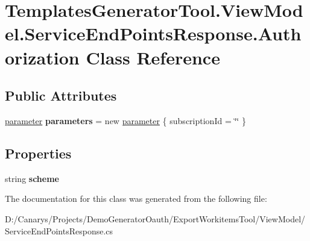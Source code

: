 \hypertarget{class_templates_generator_tool_1_1_view_model_1_1_service_end_points_response_1_1_authorization}{}\section{Templates\+Generator\+Tool.\+View\+Model.\+Service\+End\+Points\+Response.\+Authorization Class Reference}
\label{class_templates_generator_tool_1_1_view_model_1_1_service_end_points_response_1_1_authorization}
\subsection*{Public Attributes}
\begin{DoxyCompactItemize}
\item 
\mbox{\label{class_templates_generator_tool_1_1_view_model_1_1_service_end_points_response_1_1_authorization_a89bba93441920c0fbf005a934eeed2e7}} 
\mbox{\hyperlink{class_templates_generator_tool_1_1_view_model_1_1_service_end_points_response_1_1parameter}{parameter}} {\bfseries parameters} = new \mbox{\hyperlink{class_templates_generator_tool_1_1_view_model_1_1_service_end_points_response_1_1parameter}{parameter}} \{ subscription\+Id = \char`\"{}\char`\"{} \}
\end{DoxyCompactItemize}
\subsection*{Properties}
\begin{DoxyCompactItemize}
\item 
\mbox{\label{class_templates_generator_tool_1_1_view_model_1_1_service_end_points_response_1_1_authorization_a9904c30620d2950438c983f92f0b6d4e}} 
string {\bfseries scheme}
\end{DoxyCompactItemize}


The documentation for this class was generated from the following file\+:\begin{DoxyCompactItemize}
\item 
D\+:/\+Canarys/\+Projects/\+Demo\+Generator\+Oauth/\+Export\+Workitems\+Tool/\+View\+Model/Service\+End\+Points\+Response.\+cs\end{DoxyCompactItemize}
